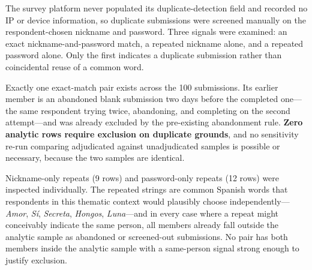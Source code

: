 \documentclass[12pt]{article}
\begin{document}
The survey platform never populated its duplicate-detection field and recorded no IP or device information,
so duplicate submissions were screened manually on the respondent-chosen nickname and password. Three
signals were examined: an exact nickname-and-password match, a repeated nickname alone, and a repeated
password alone. Only the first indicates a duplicate submission rather than coincidental reuse of a common
word.

Exactly one exact-match pair exists across the 100 submissions. Its earlier member is an abandoned blank
submission two days before the completed one---the same respondent trying twice, abandoning, and
completing on the second attempt---and was already excluded by the pre-existing abandonment rule.
\textbf{Zero analytic rows require exclusion on duplicate grounds}, and no sensitivity re-run comparing
adjudicated against unadjudicated samples is possible or necessary, because the two samples are identical.

Nickname-only repeats (9 rows) and password-only repeats (12 rows) were inspected individually. The
repeated strings are common Spanish words that respondents in this thematic context would plausibly choose
independently---\emph{Amor}, \emph{S\'i}, \emph{Secreta}, \emph{Hongos}, \emph{Luna}---and in every case
where a repeat might conceivably indicate the same person, all members already fall outside the analytic
sample as abandoned or screened-out submissions. No pair has both members inside the analytic sample with a
same-person signal strong enough to justify exclusion.
\end{document}

